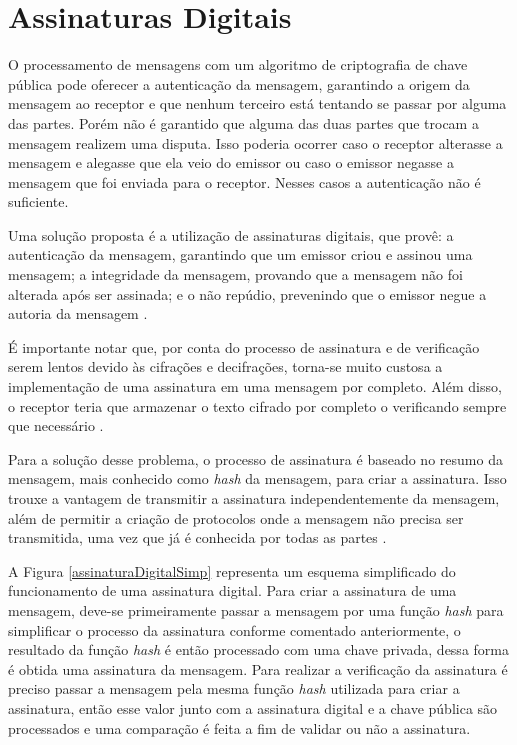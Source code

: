 \section{Assinaturas Digitais}

O processamento de mensagens com um algoritmo de criptografia de chave pública pode oferecer a autenticação da mensagem, garantindo a origem da mensagem ao receptor e que nenhum terceiro está tentando se passar por alguma das partes. Porém não é garantido que alguma das duas partes que trocam a mensagem realizem uma disputa. Isso poderia ocorrer caso o receptor alterasse a mensagem e alegasse que ela veio do emissor ou caso o emissor negasse a mensagem que foi enviada para o receptor. Nesses casos a autenticação não é suficiente. 

Uma solução proposta é a utilização de assinaturas digitais, que provê: a autenticação da mensagem, garantindo que um emissor criou e assinou uma mensagem; a integridade da mensagem, provando que a mensagem não foi alterada após ser assinada; e o não repúdio, prevenindo que o emissor negue a autoria da mensagem \cite{johnson2001elliptic}.

É importante notar que, por conta do processo de assinatura e de verificação serem lentos devido às cifrações e decifrações, torna-se muito custosa a implementação de uma assinatura em uma mensagem por completo. Além disso, o receptor teria que armazenar o texto cifrado por completo o verificando sempre que necessário \cite{diffie1998}.

Para a solução desse problema, o processo de assinatura é baseado no resumo da mensagem, mais conhecido como \textit{hash} da mensagem, para criar a assinatura. Isso trouxe a vantagem de transmitir a assinatura independentemente da mensagem, além de permitir a criação de protocolos onde a mensagem não precisa ser transmitida, uma vez que já é conhecida por todas as partes \cite{diffie1998}.

A Figura \ref{assinaturaDigitalSimp} representa um esquema simplificado do funcionamento de uma assinatura digital. Para criar a assinatura de uma mensagem, deve-se primeiramente passar a mensagem por uma função \textit{hash} para simplificar o processo da assinatura conforme comentado anteriormente, o resultado da função \textit{hash} é então processado com uma chave privada, dessa forma é obtida uma assinatura da mensagem. Para realizar a verificação da assinatura é preciso passar a mensagem pela mesma função \textit{hash} utilizada para criar a assinatura, então esse valor junto com a assinatura digital e a chave pública são processados e uma comparação é feita a fim de validar ou não a assinatura.

